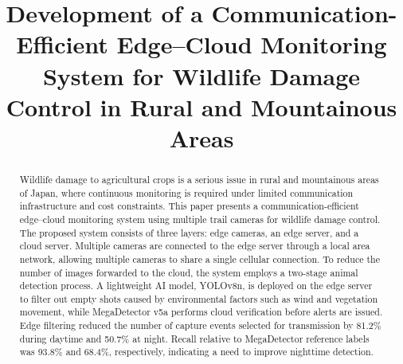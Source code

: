 \documentclass[conference]{IEEEtran}
\begin{document}
\title{Development of a Communication-Efficient Edge--Cloud Monitoring System for Wildlife Damage Control in Rural and Mountainous Areas
}

\author{
\and
{}
\and
{}
\and
{}
\and
{}
}

\maketitle

\begin{abstract}
Wildlife damage to agricultural crops is a serious issue in rural and mountainous areas of Japan, where continuous monitoring is required under limited communication infrastructure and cost constraints. This paper presents a communication-efficient edge--cloud monitoring system using multiple trail cameras for wildlife damage control. The proposed system consists of three layers: edge cameras, an edge server, and a cloud server. Multiple cameras are connected to the edge server through a local area network, allowing multiple cameras to share a single cellular connection. To reduce the number of images forwarded to the cloud, the system employs a two-stage animal detection process. A lightweight AI model, YOLOv8n, is deployed on the edge server to filter out empty shots caused by environmental factors such as wind and vegetation movement, while MegaDetector v5a performs cloud verification before alerts are issued. Edge filtering reduced the number of capture events selected for transmission by 81.2\% during daytime and 50.7\% at night. Recall relative to MegaDetector reference labels was 93.8\% and 68.4\%, respectively, indicating a need to improve nighttime detection.
\end{abstract}
\end{document}
